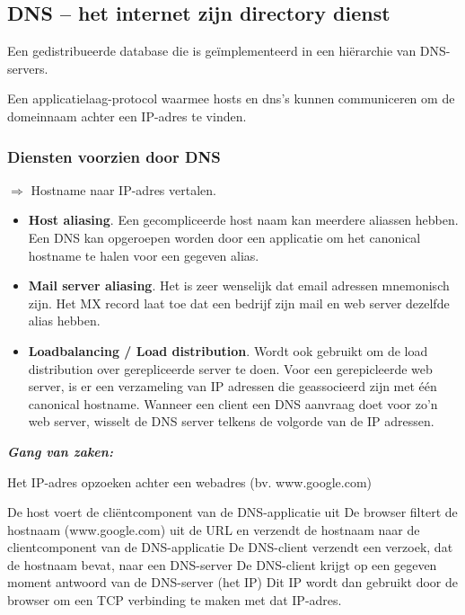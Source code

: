 \subsection{DNS – het internet zijn directory dienst}

\noindent Een gedistribueerde database die is geïmplementeerd in een hiërarchie van DNS-servers.

\noindent Een applicatielaag-protocol waarmee hosts en \acrshort{dns}’s kunnen communiceren om de domeinnaam achter een IP-adres te vinden.

\subsubsection{Diensten voorzien door DNS}

\noindent $\Rightarrow$ Hostname naar IP-adres vertalen.

\begin{itemize}
  \item \textbf{Host aliasing}. Een gecompliceerde host naam kan meerdere aliassen hebben. Een DNS kan opgeroepen worden door een applicatie om het canonical hostname te halen voor een gegeven alias.
\item \textbf{Mail server aliasing}. Het is zeer wenselijk dat email adressen mnemonisch zijn. Het MX record laat toe dat een bedrijf zijn mail en web server dezelfde alias hebben.
\item \textbf{Loadbalancing / Load distribution}. Wordt ook gebruikt om de load distribution over gerepliceerde server te doen. Voor een gerepicleerde web server, is er een verzameling van IP adressen die geassocieerd zijn met één canonical hostname. Wanneer een client een DNS aanvraag doet voor zo’n web server, wisselt de DNS server telkens de volgorde van de IP adressen.
\end{itemize}

\noindent \textit{\textbf{Gang van zaken:}}

\noindent Het IP-adres opzoeken achter een webadres (bv. www.google.com)

\be
\itf De host voert de cliëntcomponent van de DNS-applicatie uit
\itf De browser filtert de hostnaam (www.google.com) uit de URL en verzendt de hostnaam naar de clientcomponent van de DNS-applicatie
\itf De DNS-client verzendt een verzoek, dat de hostnaam bevat, naar een DNS-server
\itf De DNS-client krijgt op een gegeven moment antwoord van de DNS-server (het IP)
\itf Dit IP wordt dan gebruikt door de browser om een TCP verbinding te maken met dat IP-adres.
\ee



